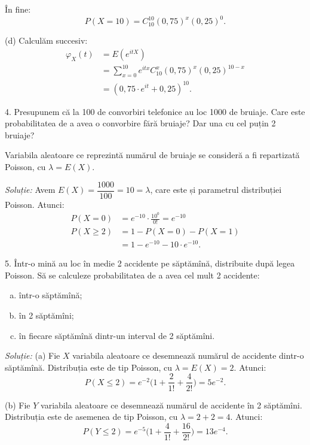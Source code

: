 În fine:
\[
  P(X = 10) = C_{10}^{10} (0,75)^x (0,25)^0.
\]

(d) Calculăm succesiv:
\begin{align*}
  \varphi_X(t) &= E(e^{itX}) \\
               &= \sum_{x = 0}^{10} e^{itx} C_{10}^x (0,75)^x (0,25)^{10-x} \\
               &= (0,75 \cdot e^{it} + 0,25)^{10}.
\end{align*}

\vspace{0.3cm}

4. Presupunem că la 100 de convorbiri telefonice au loc 1000 de bruiaje.
Care este probabilitatea de a avea o convorbire fără bruiaje? Dar una
cu cel puțin 2 bruiaje?

Variabila aleatoare ce reprezintă numărul de bruiaje se consideră a fi
repartizată Poisson, cu $ \lambda = E(X) $.

\emph{Soluție:} Avem $ E(X) = \dfrac{1000}{100} = 10 = \lambda $, care este
și parametrul distribuției Poisson. Atunci:
\begin{align*}
  P(X = 0) &= e^{-10} \cdot \frac{10^0}{0!} = e^{-10} \\
  P(X \geq 2) &= 1 - P(X = 0) - P(X = 1) \\
           &= 1 - e^{-10} - 10 \cdot e^{-10}.
\end{align*}

\vspace{0.3cm}

5. Într-o mină au loc în medie 2 accidente pe săptămînă, distribuite după legea
Poisson. Să se calculeze probabilitatea de a avea cel mult 2 accidente:
\begin{enumerate}[(a)]
\item într-o săptămînă;
\item în 2 săptămîni;
\item în fiecare săptămînă dintr-un interval de 2 săptămîni.
\end{enumerate}

\emph{Soluție:} (a) Fie $ X $ variabila aleatoare ce desemnează numărul de accidente
dintr-o săptămînă. Distribuția este de tip Poisson, cu $ \lambda = E(X) = 2 $.
Atunci:
\[
  P(X \leq 2) = e^{-2} \Big( 1 + \frac{2}{1!} + \dfrac{4}{2!} \Big) = 5e^{-2}.
\]

(b) Fie $ Y $ variabila aleatoare ce desemnează numărul de accidente în 2 săptămîni.
Distribuția este de asemenea de tip Poisson, cu $ \lambda = 2 + 2 = 4 $. Atunci:
\[
  P(Y \leq 2) = e^{-5} \Big( 1 + \frac{4}{1!} + \frac{16}{2!} \Big) = 13e^{-4}.
\]

